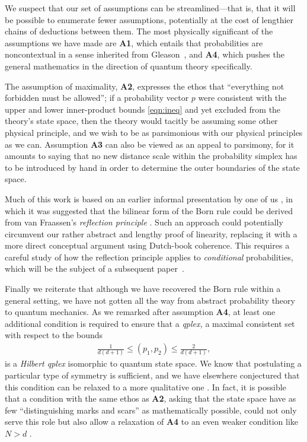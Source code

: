 \documentclass[%
 reprint,superscriptaddress,
 amsmath,amssymb,
 aps,pra, onecolumn, 12pt
]{revtex4-2}
\newcommand{\eqn}[1]{\begin{eqnarray} #1 \end{eqnarray}}
\begin{document}
We suspect that our set of assumptions can be streamlined---that is, that it will be possible to enumerate fewer assumptions, potentially at the cost of lengthier chains of deductions between them. The most physically significant of the assumptions we have made are {\bf A1}, which entails that probabilities are noncontextual in a sense inherited from Gleason~\cite{BUSCH, RENES}, and {\bf A4}, which pushes the general mathematics in the direction of quantum theory specifically.

The assumption of maximality, {\bf A2}, expresses the ethos that ``everything not forbidden must be allowed''; if a probability vector $p$ were consistent with the upper and lower inner-product bounds \eqref{eqn:ineq} and yet excluded from the theory's state space, then the theory would tacitly be assuming some other physical principle, and we wish to be as parsimonious with our physical principles as we can. Assumption {\bf A3} can also be viewed as an appeal to parsimony, for it amounts to saying that no new distance scale within the probability simplex has to be introduced by hand in order to determine the outer boundaries of the state space.

Much of this work is based on an earlier informal presentation by one of us \cite{VITALITY}, in which it was suggested that the bilinear form of the Born rule could be derived from van Fraassen's  \emph{reflection principle} \cite{VANF, FS_reflection}. Such an approach could potentially circumvent our rather abstract and lengthy proof of linearity, replacing it with a more direct conceptual argument using Dutch-book coherence. This requires a careful study of how the reflection principle applies to \emph{conditional} probabilities, which will be the subject of a subsequent paper~\cite{FutureWork}.

Finally we reiterate that although we have recovered the Born rule within a general setting, we have not gotten all the way from abstract probability theory to quantum mechanics. As we remarked after assumption {\bf A4}, at least one additional condition is required to ensure that a \emph{qplex,} a maximal consistent set with respect to the bounds
\eqn{
\frac{1}{d(d+1)} \leq (p_1,p_2) \leq \frac{2}{d(d+1)}, \nonumber
}
is a \emph{Hilbert qplex} isomorphic to quantum state space. We know that postulating a particular type of symmetry is sufficient, and we have elsewhere conjectured that this condition can be relaxed to a more qualitative one \cite{QPLEX}. In fact, it is possible that a condition with the same ethos as {\bf A2}, asking that the state space have as few ``distinguishing marks and scars'' as mathematically possible, could not only serve this role but also allow a relaxation of {\bf A4} to an even weaker condition like $N > d$ \cite{VITALITY}.
\end{document}
